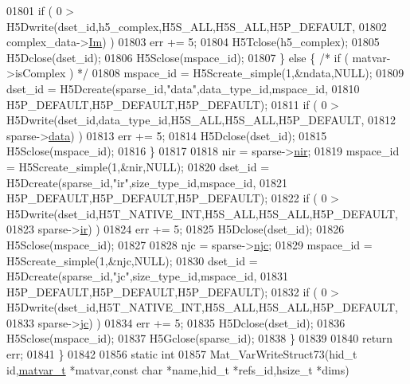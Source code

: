 \begin{DoxyCode}
{{{01801             \textcolor{keywordflow}{if} ( 0 > H5Dwrite(dset\_id,h5\_complex,H5S\_ALL,H5S\_ALL,H5P\_DEFAULT,
01802                               complex\_data->\hyperlink{group___m_a_t_a7182d10b0d3598415887376065440946}{Im}) )
01803                 err += 5;
01804             H5Tclose(h5\_complex);
01805             H5Dclose(dset\_id);
01806             H5Sclose(mspace\_id);
01807         \} \textcolor{keywordflow}{else} \{ \textcolor{comment}{/* if ( matvar->isComplex ) */}
01808             mspace\_id = H5Screate\_simple(1,&ndata,NULL);
01809             dset\_id = H5Dcreate(sparse\_id,\textcolor{stringliteral}{"data"},data\_type\_id,mspace\_id,
01810                                 H5P\_DEFAULT,H5P\_DEFAULT,H5P\_DEFAULT);
01811             \textcolor{keywordflow}{if} ( 0 > H5Dwrite(dset\_id,data\_type\_id,H5S\_ALL,H5S\_ALL,H5P\_DEFAULT,
01812                               sparse->\hyperlink{group___m_a_t_ae2c648cb9eac4ce47f26cddb44246152}{data}) )
01813                 err += 5;
01814             H5Dclose(dset\_id);
01815             H5Sclose(mspace\_id);
01816         \}
01817 
01818         nir = sparse->\hyperlink{group___m_a_t_aa64636ad57cf87f7a28ff5018437a850}{nir};
01819         mspace\_id = H5Screate\_simple(1,&nir,NULL);
01820         dset\_id = H5Dcreate(sparse\_id,\textcolor{stringliteral}{"ir"},size\_type\_id,mspace\_id,
01821                             H5P\_DEFAULT,H5P\_DEFAULT,H5P\_DEFAULT);
01822         \textcolor{keywordflow}{if} ( 0 > H5Dwrite(dset\_id,H5T\_NATIVE\_INT,H5S\_ALL,H5S\_ALL,H5P\_DEFAULT,
01823                           sparse->\hyperlink{group___m_a_t_a8d4c863d704edddec5cbfa15b2d719c8}{ir}) )
01824             err += 5;
01825         H5Dclose(dset\_id);
01826         H5Sclose(mspace\_id);
01827 
01828         njc = sparse->\hyperlink{group___m_a_t_a482d8e4b40aa975f0c1daf146ebe08a4}{njc};
01829         mspace\_id = H5Screate\_simple(1,&njc,NULL);
01830         dset\_id = H5Dcreate(sparse\_id,\textcolor{stringliteral}{"jc"},size\_type\_id,mspace\_id,
01831                             H5P\_DEFAULT,H5P\_DEFAULT,H5P\_DEFAULT);
01832         \textcolor{keywordflow}{if} ( 0 > H5Dwrite(dset\_id,H5T\_NATIVE\_INT,H5S\_ALL,H5S\_ALL,H5P\_DEFAULT,
01833                           sparse->\hyperlink{group___m_a_t_ad1e74cdc4f7eff1e47a670297c01da4b}{jc}) )
01834             err += 5;
01835         H5Dclose(dset\_id);
01836         H5Sclose(mspace\_id);
01837         H5Gclose(sparse\_id);
01838     \}
01839 
01840     \textcolor{keywordflow}{return} err;
01841 \}
01842 
01856 \textcolor{keyword}{static} \textcolor{keywordtype}{int}
01857 Mat\_VarWriteStruct73(hid\_t \textcolor{keywordtype}{id},\hyperlink{group___m_a_t_structmatvar__t}{matvar\_t} *matvar,\textcolor{keyword}{const} \textcolor{keywordtype}{char} *name,hid\_t *refs\_id,hsize\_t *dims)
}}}
\end{DoxyCode}
